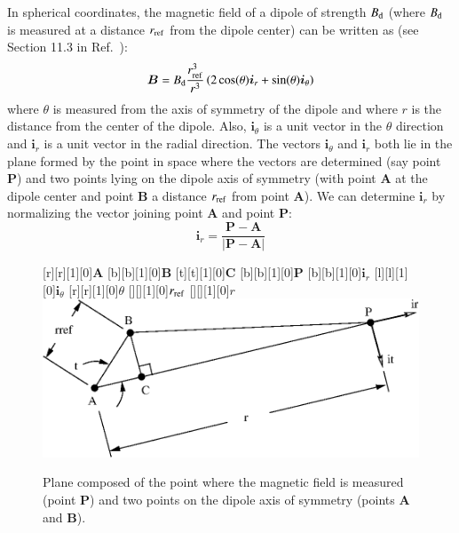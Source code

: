 \documentclass{warpdoc}
\newlength\lengthfigure                  %
\renewcommand{\fontsizefigure}{\footnotesize}
\newcommand{\Bdipole}{B_{\rm d}}
\renewcommand{\vec}[1]{\bm{#1}}
\begin{document}
In spherical coordinates,
the magnetic field of a dipole of strength $\Bdipole$ (where $\Bdipole$ is measured
at a distance $r_{\rm ref}$ from the dipole center) can be written as
(see Section 11.3 in Ref.\ \cite{book:1985:purcell}):
%
\begin{equation}
  \vec{B}=\Bdipole\frac{r_{\rm ref}^3}{r^3} \left( 2 \cos (\theta) \vec{i}_r +\sin (\theta) \vec{i}_\theta  \right)
\end{equation}
%
where $\theta$ is measured from the axis of symmetry of the dipole and where $r$ is the distance
from the center of the dipole. Also, $\vec{i}_\theta$ is a unit vector in the $\theta$
direction and $\vec{i}_r$ is a unit vector in the radial direction. The vectors
$\vec{i}_\theta$ and $\vec{i}_r$ both lie in the plane formed by the point in space
where the vectors are determined (say point {$\vec{P}$}) and two points lying on
the dipole axis of symmetry (with point {$\vec{A}$} at the dipole center and point {$\vec{B}$}
a distance $r_{\rm ref}$ from point {$\vec{A}$}). We can determine $\vec{i}_r$ by normalizing
the vector joining point {$\vec{A}$} and point {$\vec{P}$}:
%
\begin{equation}
\vec{i}_r=\frac{\vec{P}-\vec{A}}{|\vec{P}-\vec{A}|}
\end{equation}
%
\begin{figure}
   \fontsizefigure\center
   [r][r][1][0]{${\vec{A}}$}
   [b][b][1][0]{${\vec{B}}$}
   [t][t][1][0]{${\vec{C}}$}
   [b][b][1][0]{${\vec{P}}$}
   [b][b][1][0]{$\vec{i}_r$}
   [l][l][1][0]{$\vec{i}_\theta$}
   [r][r][1][0]{$\theta$}
   [][][1][0]{$r_{\rm ref}$}
   [][][1][0]{$r$}
   \includegraphics[width=4.0\lengthfigure]{dipoleplane.eps}
\caption{Plane composed of the point where the magnetic field is measured (point ${\vec{P}}$)
         and two points on the dipole axis of symmetry (points $\vec{{A}}$ and ${\vec{B}}$).}
\label{fig:dipoleplane}
\end{figure}
\end{document}

